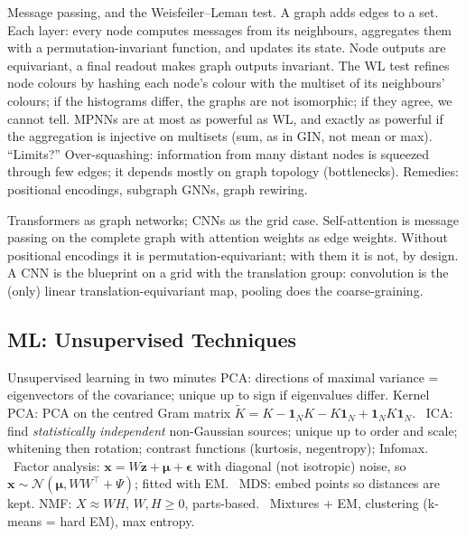 \begin{qabox}{\cexam Message passing, and the Weisfeiler--Leman test.}
\ans A graph adds edges to a set. Each layer: every node computes messages from its neighbours,
aggregates them with a permutation-invariant function, and updates its state. Node outputs are
equivariant, a final readout makes graph outputs invariant. The WL test refines node colours by
hashing each node's colour with the multiset of its neighbours' colours; if the histograms differ,
the graphs are not isomorphic; if they agree, we cannot tell. MPNNs are at most as powerful as WL,
and exactly as powerful if the aggregation is injective on multisets (sum, as in GIN, not mean or max).
\follow ``Limits?'' Over-squashing: information from many distant nodes is squeezed through few
edges; it depends mostly on graph topology (bottlenecks). Remedies: positional encodings,
subgraph GNNs, graph rewiring.
\end{qabox}

\begin{qabox}{\cexam Transformers as graph networks; CNNs as the grid case.}
\ans Self-attention is message passing on the complete graph with attention weights as edge
weights. Without positional encodings it is permutation-equivariant; with them it is not, by
design. A CNN is the blueprint on a grid with the translation group: convolution is the (only)
linear translation-equivariant map, pooling does the coarse-graining.
\end{qabox}

\subsection{ML: Unsupervised Techniques}

\begin{summary}{Unsupervised learning in two minutes}
\textsf{PCA:} directions of maximal variance = eigenvectors of the covariance; unique up to sign if
eigenvalues differ. \textsf{Kernel PCA:} PCA on the centred Gram matrix
$\tilde K=K-\mathbf{1}_NK-K\mathbf{1}_N+\mathbf{1}_NK\mathbf{1}_N$. \
\textsf{ICA:} find \emph{statistically independent} non-Gaussian sources; unique up to order and
scale; whitening then rotation; contrast functions (kurtosis, negentropy); Infomax. \
\textsf{Factor analysis:} $\mathbf{x}=W\mathbf{z}+\bm\mu+\bm\epsilon$ with diagonal (not isotropic)
noise, so $\mathbf{x}\sim\mathcal{N}(\bm\mu,WW^\top+\Psi)$; fitted with EM. \
\textsf{MDS:} embed points so distances are kept. \textsf{NMF:} $X\approx WH$, $W,H\ge0$, parts-based. \
\textsf{Mixtures + EM}, \textsf{clustering} (k-means = hard EM), \textsf{max entropy}.
\end{summary}

